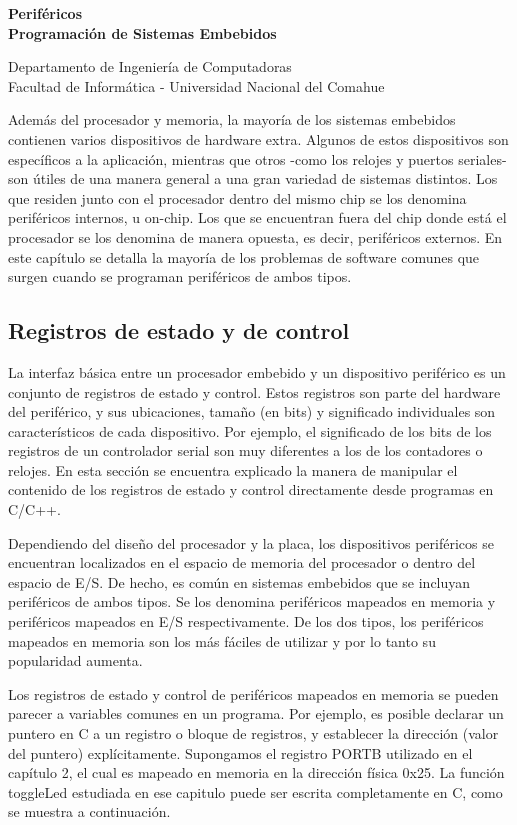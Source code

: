 \documentclass[12pt]{article}
\def\maketitle{

 \makeatletter
 {\color{bl} \centering \huge \sc \textbf{
 Periféricos\\ 
\large \vspace*{-8pt} \color{black} Programación de Sistemas Embebidos
 \vspace*{8pt} }\par}
 \makeatother


 \makeatletter
 {\centering \small 
 	Departamento de Ingeniería de Computadoras \\
 	Facultad de Informática - Universidad Nacional del Comahue \\
 	\vspace{20pt} }
 \makeatother

}
\begin{document}
\thispagestyle{empty}
\maketitle
\setlength{\parindent}{0pt}




Además del procesador y memoria, la mayoría de los sistemas embebidos
contienen varios dispositivos de hardware extra. Algunos de estos
dispositivos son específicos a la aplicación, mientras que otros -como los
relojes y puertos seriales- son útiles de una manera general a una gran 
variedad de sistemas distintos.
Los que residen junto con el procesador dentro del mismo chip se los
denomina periféricos internos, u on-chip. Los que se encuentran fuera
del chip donde está el procesador se los denomina de manera opuesta,
es decir, periféricos externos. En este capítulo se detalla la
mayoría de los problemas de software comunes que surgen cuando se programan
periféricos de ambos tipos.

\subsection *{Registros de estado y de control}

La interfaz básica entre un procesador embebido y un dispositivo periférico
es un conjunto de registros de estado y control. Estos registros son parte
del hardware del periférico, y sus ubicaciones, tamaño (en bits) y significado
individuales son característicos de cada dispositivo. Por ejemplo, 
el significado de los bits de los registros de un controlador serial son 
muy diferentes a los
de los contadores o relojes. En esta sección se encuentra explicado la 
manera de manipular el contenido de los registros de estado y control
directamente desde programas en C/C++.

Dependiendo del diseño del procesador y la placa, los dispositivos periféricos
se encuentran localizados en el espacio de memoria del procesador o dentro
del espacio de E/S. De hecho, es común en sistemas embebidos que se incluyan
periféricos de ambos tipos. Se los denomina periféricos mapeados en memoria
y periféricos mapeados en E/S respectivamente. De los dos tipos, los periféricos
mapeados en memoria son los más fáciles de utilizar y por lo tanto su popularidad
aumenta.

Los registros de estado y control de periféricos mapeados en memoria se pueden
parecer a variables comunes en un programa. Por ejemplo, es posible 
declarar un puntero en C a un registro o bloque de registros, 
y establecer
la dirección (valor del puntero) explícitamente. Supongamos el registro
PORTB utilizado en el capítulo 2, el cual es mapeado en memoria en la dirección 
física 0x25. La función toggleLed estudiada en ese capitulo puede ser 
escrita completamente en C, como se muestra a continuación.
\end{document}
